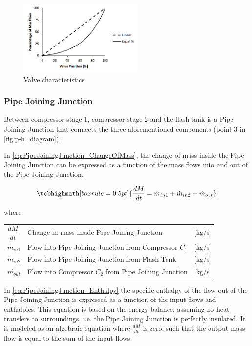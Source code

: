 \begin{figure}[h]
	\centering
	\includegraphics[width=0.55\textwidth]{Graphics/Equal-percentage.png}
	\caption{Valve characteristics}
	\label{fig:equal_percent_valve}
\end{figure}


\subsubsection{Pipe Joining Junction}\label{sec:pipe-joining-junction}
Between compressor stage 1, compressor stage 2 and the flash tank is a Pipe Joining Junction that connects the three aforementioned components (point 3 in \cref{fig:p-h_diagram}).

In \cref{eq:PipeJoiningJunction_ChangeOfMass}, the change of mass inside the Pipe Joining Junction can be expressed as a function of the mass flows into and out of the Pipe Joining Junction.


\begin{equation}
	\tcbhighmath[boxrule = 0.5pt]{ \frac{dM}{dt} = \dot{m}_{in1} + \dot{m}_{in2} - \dot{m}_{out} }       \label{eq:PipeJoiningJunction_ChangeOfMass}
\end{equation}

where

\begin{center}
	\begin{tabular}{l p{8cm} l}
		$\dfrac{dM}{dt}$ & Change in mass inside Pipe Joining Junction             & [\si{kg}/\si{s}] \\
		$\dot{m}_{in1}$  & Flow into Pipe Joining Junction from Compressor $ C_1 $ & [\si{kg}/\si{s}] \\
		$\dot{m}_{in2}$  & Flow into Pipe Joining Junction from Flash Tank         & [\si{kg}/\si{s}] \\
		$\dot{m_{out}}$  & Flow into Compressor $ C_2 $ from Pipe Joining Junction & [\si{kg}/\si{s}]
	\end{tabular}
\end{center}

In \cref{eq:PipeJoiningJunction_Enthalpy} the specific enthalpy of the flow out of the Pipe Joining Junction is expressed as a function of the input flows and enthalpies. This equation is based on the energy balance, assuming no heat transfers to surroundings, i.e. the Pipe Joining Junction is perfectly insulated. It is modeled as an algebraic equation where $\frac{dM}{dt}$ is zero, such that the output mass flow is equal to the sum of the input flows.

